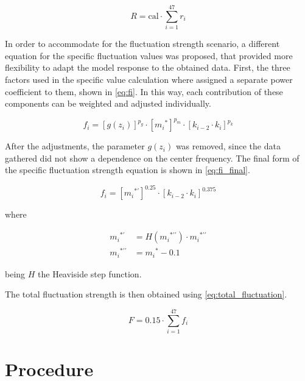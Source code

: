 \documentclass[../main.tex]{subfiles}
\begin{document}
\begin{modelchapter}
\begin{equation}
  R = \text{cal} \cdot \displaystyle\sum_{i=1}^{47} r_i
  \label{eq:total_roughness}
\end{equation}

In order to accommodate for the fluctuation strength scenario, a different
equation for the specific fluctuation values was proposed, that provided more
flexibility to adapt the model response to the obtained data. First, the three
factors used in the specific value calculation where assigned a separate power
coefficient to them, shown in \cref{eq:fi}. In this way, each contribution of
these components can be weighted and adjusted individually.

\begin{equation}
  f_i = [g(z_i)]^{p_g} \cdot [{m_i}^*]^{p_m} \cdot [k_{i-2} \cdot k_i]^{p_k}
  \label{eq:fi}
\end{equation}

After the adjustments, the parameter $g(z_i)$ was removed, since the data
gathered did not show a dependence on the center frequency. The final form
of the specific fluctuation strength equation is shown in \cref{eq:fi_final}.

\begin{equation}
  f_i = [{m_i}^{*\prime}]^{0.25} \cdot [k_{i-2} \cdot k_i]^{0.375}
  \label{eq:fi_final}
\end{equation}

where

\begin{align}
  {m_i}^{*\prime} &= H({m_i}^{*\prime\prime}) \cdot {m_i}^{*\prime\prime}
  \label{eq:md_transformation_1} \\
  {m_i}^{*\prime\prime} &= {m_i}^* - 0.1
  \label{eq:md_transformation_2}
\end{align}

being $H$ the Heaviside step function.

The total fluctuation strength is then obtained using
\cref{eq:total_fluctuation}.

\begin{equation}
  F = 0.15 \cdot \displaystyle\sum_{i=1}^{47} f_i
  \label{eq:total_fluctuation}
\end{equation}

\section{Procedure}


\end{modelchapter}
\end{document}
